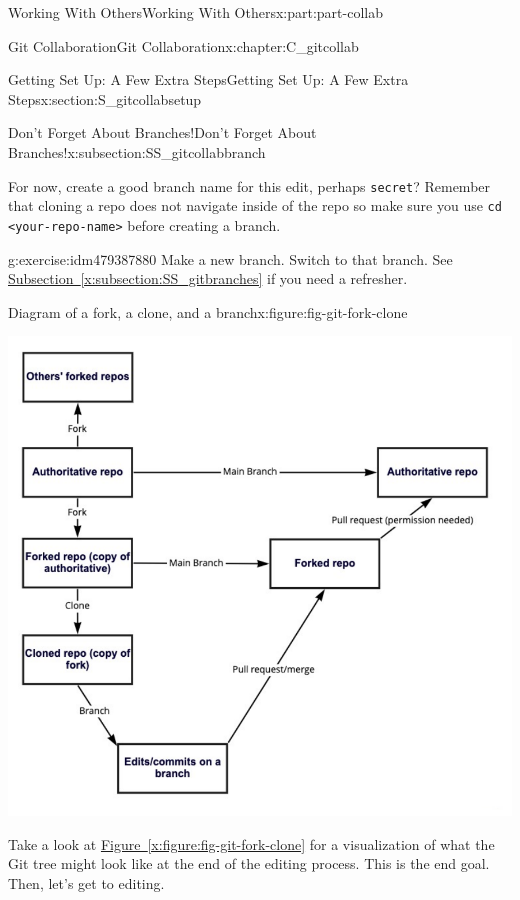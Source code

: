 \documentclass[oneside,10pt,]{book}
\newcommand{\xreffont}{\relax}
\newcommand{\mono}[1]{\texttt{#1}}
\begin{document}
\begin{partptx}{Working With Others}{}{Working With Others}{}{}{x:part:part-collab}
\begin{chapterptx}{Git Collaboration}{}{Git Collaboration}{}{}{x:chapter:C_gitcollab}
\begin{sectionptx}{Getting Set Up: A Few Extra Steps}{}{Getting Set Up: A Few Extra Steps}{}{}{x:section:S_gitcollabsetup}
\begin{subsectionptx}{Don't Forget About Branches!}{}{Don't Forget About Branches!}{}{}{x:subsection:SS_gitcollabbranch}
\par
For now, create a good branch name for this edit, perhaps \mono{secret}? Remember that cloning a repo does not navigate inside of the repo so make sure you use \mono{cd <your-repo-name>} before creating a branch.%
\begin{inlineexercise}{}{g:exercise:idm479387880}%
Make a new branch. Switch to that branch. See \hyperref[x:subsection:SS_gitbranches]{Subsection~{\xreffont\ref{x:subsection:SS_gitbranches}}} if you need a refresher.%
\end{inlineexercise}%
\begin{figureptx}{Diagram of a fork, a clone, and a branch}{x:figure:fig-git-fork-clone}{}%
\begin{image}{0.1}{0.8}{0.1}%
\includegraphics[width=\linewidth]{external/git_fork_clone.pdf}
\end{image}%
\tcblower
\end{figureptx}%
Take a look at \hyperref[x:figure:fig-git-fork-clone]{Figure~{\xreffont\ref{x:figure:fig-git-fork-clone}}} for a visualization of what the Git tree might look like at the end of the editing process. This is the end goal. Then, let's get to editing.%
\end{subsectionptx}
\end{sectionptx}
%
%
\typeout{************************************************}

\end{chapterptx}
\end{partptx}
\end{document}
